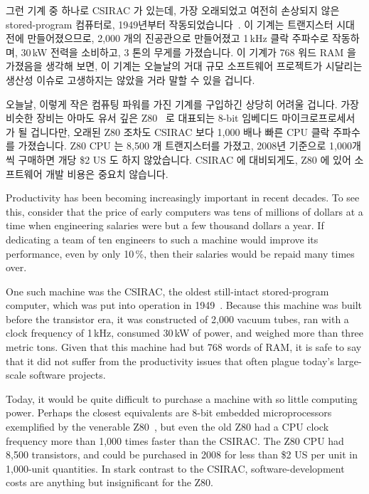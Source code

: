 그런 기계 중 하나로 CSIRAC 가 있는데, 가장 오래되었고 여전히 손상되지 않은
stored-program 컴퓨터로, 1949년부터
작동되었습니다~\cite{CSIRACMuseumVictoria,CSIRACUniversityMelbourne}.
이 기계는 트랜지스터 시대 전에 만들어졌으므로, 2,000 개의 진공관으로 만들어졌고
1\,kHz 클락 주파수로 작동하며, 30\,kW 전력을 소비하고, 3 톤의 무게를
가졌습니다.
이 기계가 768 워드 RAM 을 가졌음을 생각해 보면, 이 기계는 오늘날의 거대 규모
소프트웨어 프로젝트가 시달리는 생산성 이슈로 고생하지는 않았을 거라 말할 수
있을 겁니다.

오늘날, 이렇게 작은 컴퓨팅 파워를 가진 기계를 구입하긴 상당히 어려울 겁니다.
가장 비슷한 장비는 아마도 유서 깊은 Z80~\cite{z80Wikipedia} 로 대표되는 8-bit
임베디드 마이크로프로세서가 될 겁니다만, 오래된 Z80 조차도 CSIRAC 보다 1,000
배나 빠른 CPU 클락 주파수를 가졌습니다.
Z80 CPU 는 8,500 개 트랜지스터를 가졌고, 2008년 기준으로 1,000개씩 구매하면
개당 \$2 US 도 하지 않았습니다.
CSIRAC 에 대비되게도, Z80 에 있어 소프트웨어 개발 비용은 중요치 않습니다.

\iffalse

Productivity has been becoming increasingly important in recent decades.
To see this, consider that the price of early computers was tens
of millions of dollars at
a time when engineering salaries were but a few thousand dollars a year.
If dedicating a team of ten engineers to such a machine would improve
its performance, even by only 10\,\%, then their salaries
would be repaid many times over.

One such machine was the CSIRAC, the oldest still-intact stored-program
computer, which was put into operation in
1949~\cite{CSIRACMuseumVictoria,CSIRACUniversityMelbourne}.
Because this machine was built before the transistor era, it was constructed
of 2,000 vacuum tubes, ran with a clock frequency of 1\,kHz,
consumed 30\,kW of power, and weighed more than three metric tons.
Given that this machine had but 768 words of RAM, it is safe to say that
it did not suffer from the productivity issues that often plague
today's large-scale software projects.

Today, it would be quite difficult to purchase a machine with so
little computing power.
Perhaps the closest equivalents
are 8-bit embedded microprocessors exemplified by the venerable
Z80~\cite{z80Wikipedia}, but even the old Z80 had a CPU clock
frequency more than 1,000 times faster than the CSIRAC\@.
The Z80 CPU had 8,500 transistors, and could be purchased in 2008
for less than \$2 US per unit in 1,000-unit quantities.
In stark contrast to the CSIRAC, software-development costs are
anything but insignificant for the Z80.


